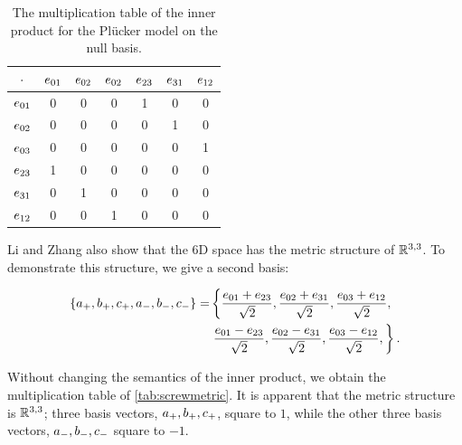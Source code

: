 \begin{table}
  \caption{The multiplication table of the inner product for the Pl\"ucker model on the null basis.}
  \label{tab:nullmetric}
  \begin{center}
    \begin{tabular}{|c||c|c|c|c|c|c|}
      \hline
      $\mathbin{\cdot}$ & $e_{01}$ & $e_{02}$ & $e_{02}$ & $e_{23}$ & $e_{31}$ & $e_{12}$ \\
      \hline \hline
      $e_{01}$ & 0 & 0 & 0 & 1 & 0 & 0 \\
      \hline
      $e_{02}$ & 0 & 0 & 0 & 0 & 1 & 0 \\
      \hline
      $e_{03}$ & 0 & 0 & 0 & 0 & 0 & 1 \\
      \hline
      $e_{23}$ & 1 & 0 & 0 & 0 & 0 & 0 \\
      \hline
      $e_{31}$ & 0 & 1 & 0 & 0 & 0 & 0 \\
      \hline
      $e_{12}$ & 0 & 0 & 1 & 0 & 0 & 0 \\
      \hline
    \end{tabular}
  \end{center}
\end{table}

Li and Zhang also show that the 6D space has the metric structure of $\mathbb{R}^{3,3}$.  To demonstrate this structure, we give a second basis:

\begin{equation*}
  \begin{split}
  \left\{a_{+}, b_{+}, c_{+}, a_{-}, b_{-}, c_{-}\right\} =
    & \left\{ \frac{e_{01} + e_{23}}{\sqrt{2}}, \frac{e_{02} + e_{31}}{\sqrt{2}}, \frac{e_{03} + e_{12}}{\sqrt{2}}, \right.\\
    & \left.  \frac{e_{01} - e_{23}}{\sqrt{2}}, \frac{e_{02} - e_{31}}{\sqrt{2}}, \frac{e_{03} - e_{12}}{\sqrt{2}}, \right\}
.
\end{split}
\end{equation*}

Without changing the semantics of the inner product, we obtain the multiplication table of \autoref{tab:screwmetric}.  It is apparent that the metric structure is $\mathbb{R}^{3,3}$; three basis vectors, $a_{+}, b_{+}, c_{+}$, square to $1$, while the other three basis vectors, $a_{-}, b_{-}, c_{-}$ square to $-1$.  

